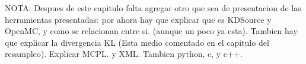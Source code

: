NOTA: Despues de este capitulo falta agregar otro que sea de presentacion de las herramientas presentadas: por ahora hay que explicar que es KDSource y OpenMC, y como se relacionan entre si. (aunque un poco ya esta).  Tambien hay que explicar la divergencia KL (Esta medio comentado en el capitulo del resampleo). Explicar MCPL. y XML. Tambien python, c, y c++.









